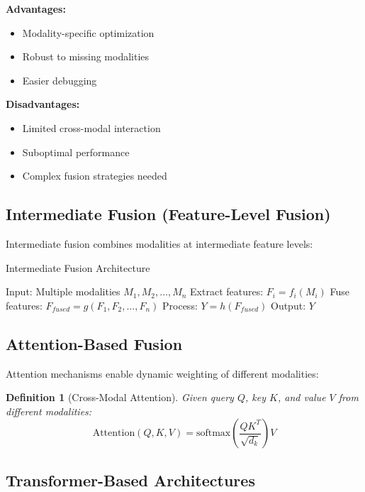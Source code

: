 \documentclass[11pt,a4paper]{article}
\newtheorem{definition}[theorem]{Definition}
\begin{document}
\textbf{Advantages:}
\begin{itemize}
\item Modality-specific optimization
\item Robust to missing modalities
\item Easier debugging
\end{itemize}

\textbf{Disadvantages:}
\begin{itemize}
\item Limited cross-modal interaction
\item Suboptimal performance
\item Complex fusion strategies needed
\end{itemize}

\subsection{Intermediate Fusion (Feature-Level Fusion)}

Intermediate fusion combines modalities at intermediate feature levels:

\begin{algorithm}
\caption{Intermediate Fusion Architecture}
\begin{algorithmic}[1]
\STATE Input: Multiple modalities $M_1, M_2, \ldots, M_n$
    \STATE Extract features: $F_i = f_i(M_i)$
\ENDFOR
\STATE Fuse features: $F_{fused} = g(F_1, F_2, \ldots, F_n)$
\STATE Process: $Y = h(F_{fused})$
\STATE Output: $Y$
\end{algorithmic}
\end{algorithm}

\subsection{Attention-Based Fusion}

Attention mechanisms enable dynamic weighting of different modalities:

\begin{definition}[Cross-Modal Attention]
Given query $Q$, key $K$, and value $V$ from different modalities:
$$\text{Attention}(Q,K,V) = \text{softmax}\left(\frac{QK^T}{\sqrt{d_k}}\right)V$$
\end{definition}

\subsection{Transformer-Based Architectures}
\end{document}
